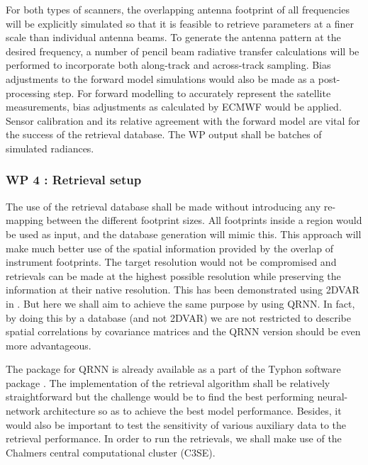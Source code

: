 \documentclass[12pt,oneside,a4paper]{article}
\begin{document}
For both types of scanners, the overlapping antenna footprint of all frequencies will be explicitly simulated so that it is feasible to retrieve parameters at a finer scale than individual antenna beams. To generate the antenna pattern at the desired frequency, a number of pencil beam radiative transfer calculations will be performed to incorporate both along-track and across-track sampling. Bias adjustments to the forward model simulations would also be made as a post-processing step. For forward modelling to accurately represent the satellite measurements, bias adjustments as calculated by ECMWF would be applied. Sensor calibration and its relative agreement with the forward model are vital for the success of the retrieval database. 
The WP output shall be batches of simulated radiances.

\subsubsection*{WP 4 : Retrieval setup}
%
\label{sec:setup}
The use of the retrieval database shall be made without introducing any re-mapping between the different footprint sizes. All footprints inside a region would be used as input, and the database generation will mimic this. This approach will make much better use of the spatial information provided by the overlap of instrument footprints. The target resolution would not be compromised and retrievals can be made at the highest possible resolution while preserving the information at their native resolution. This has been demonstrated using 2DVAR in \citep{duncan:onthe:19}. But here we shall aim to achieve the same purpose by using QRNN. In fact, by doing this by a database (and not 2DVAR) we are not restricted to describe spatial correlations by covariance matrices and the QRNN version should be even more advantageous.

The package for QRNN is already available as a part of the Typhon software package \citep{lemke:2020:typhon}. The implementation of the retrieval algorithm shall be relatively straightforward but the challenge would be to find the best performing neural-network architecture so as to achieve the best model performance. Besides, it would also be important to test the sensitivity of various auxiliary data to the retrieval performance. In order to run the retrievals, we shall make use of the Chalmers central computational cluster (C3SE).
\end{document}
